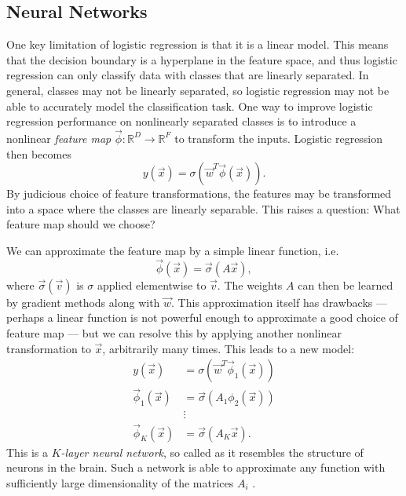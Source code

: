     \subsection{Neural Networks}
    \label{sec:neural-networks}

        One key limitation of logistic regression is that it is a linear model. This means that the decision boundary is a hyperplane in the feature space, and thus logistic regression can only classify data with classes that are linearly separated. In general, classes may not be linearly separated, so logistic regression may not be able to accurately model the classification task. One way to improve logistic regression performance on nonlinearly separated classes is to introduce a nonlinear \emph{feature map} $\vec\phi : \mathbb{R}^D \to \mathbb{R}^F$ to transform the inputs. Logistic regression then becomes
        \[
            y(\vec x) = \sigma(\vec w^T \vec\phi(\vec x)).
        \]
        By judicious choice of feature transformations, the features may be transformed into a space where the classes are linearly separable. This raises a question: What feature map should we choose?

        We can approximate the feature map by a simple linear function, i.e.
        \[
            \vec\phi(\vec x) = \vec\sigma(A \vec x),
        \]
        where $\vec\sigma(\vec v)$ is $\sigma$ applied elementwise to $\vec v$. The weights $A$ can then be learned by gradient methods along with $\vec w$. This approximation itself has drawbacks --- perhaps a linear function is not powerful enough to approximate a good choice of feature map --- but we can resolve this by applying another nonlinear transformation to $\vec x$, arbitrarily many times. This leads to a new model:
        \begin{align*}
            y(\vec x) &= \sigma(\vec w^T \vec\phi_1(\vec x))\\
            \vec\phi_1(\vec x) &= \vec\sigma(A_1 \phi_2(\vec x))\\
            &\vdots\\
            \vec\phi_K(\vec x) &= \vec\sigma(A_K \vec x).
        \end{align*}
        This is a \emph{$K$-layer neural network}, so called as it resembles
        the structure of neurons in the brain. Such a network is able to
        approximate any function with sufficiently large dimensionality of the
        matrices $A_i$ \citep{gybenko89}.

